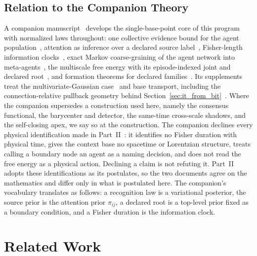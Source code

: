 \documentclass[11pt]{article}
\begin{document}
\subsection{Relation to the Companion Theory}\label{sec:companion_theory}

A companion manuscript~\cite{DennisGaugeVFE2026} develops the single-base-point core of this program with normalized laws throughout: one collective evidence bound for the agent population~\cite[Ch.~5]{DennisGaugeVFE2026}, attention as inference over a declared source label~\cite[Ch.~6]{DennisGaugeVFE2026}, Fisher-length information clocks~\cite[Ch.~7]{DennisGaugeVFE2026}, exact Markov coarse-graining of the agent network into meta-agents~\cite[Chs.~9 and~11]{DennisGaugeVFE2026}, the multiscale free energy with its episode-indexed joint and declared root~\cite[Ch.~12]{DennisGaugeVFE2026}, and formation theorems for declared families~\cite[Ch.~13]{DennisGaugeVFE2026}. Its supplements treat the multivariate-Gaussian case~\cite{DennisGaugeVFESuppG2026} and base transport, including the connection-relative pullback geometry behind Section~\ref{sec:it_from_bit}~\cite{DennisGaugeVFESuppB2026}. Where the companion supersedes a construction used here, namely the consensus functional, the barycenter and detector, the same-time cross-scale shadows, and the self-closing apex, we say so at the construction. The companion declines every physical identification made in Part~II~\cite[Chs.~1 and~14]{DennisGaugeVFE2026}: it identifies no Fisher duration with physical time, gives the context base no spacetime or Lorentzian structure, treats calling a boundary node an agent as a naming decision, and does not read the free energy as a physical action. Declining a claim is not refuting it. Part~II adopts these identifications as its postulates, so the two documents agree on the mathematics and differ only in what is postulated here. The companion's vocabulary translates as follows: a recognition law is a variational posterior, the source prior is the attention prior $\pi_{ij}$, a declared root is a top-level prior fixed as a boundary condition, and a Fisher duration is the information clock.

\section{Related Work}\label{sec:related_work}
\end{document}
